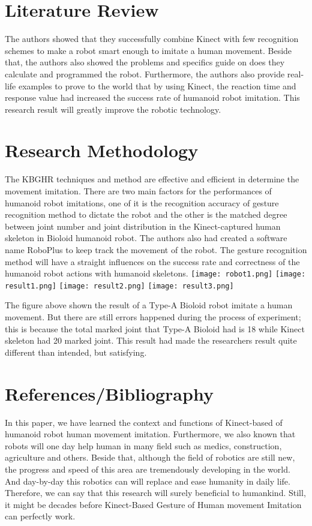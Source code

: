 \documentclass[a4paper,12pt]{article}
\begin{document}
\newpage
\section{Literature Review}
\hspace*{1cm} The authors showed that they successfully combine Kinect with few recognition schemes to make a robot smart enough to imitate a human movement. Beside that, the authors also showed the problems and specifics guide on does they calculate and programmed the robot. Furthermore, the authors also provide real-life examples to prove to the world that by using Kinect, the reaction time and response value had increased the success rate of humanoid robot imitation. This research result will greatly improve the robotic technology.

\section{Research Methodology}
\hspace*{1cm} The KBGHR techniques and method are effective and efficient in determine the movement imitation. There are two main factors for the performances of humanoid robot imitations, one of it is the recognition accuracy of gesture recognition method to dictate the robot and the other is the matched degree between joint number and joint distribution in the Kinect-captured human skeleton in Bioloid humanoid robot. The authors also had created a software name RoboPlus to keep track the movement of the robot. The gesture recognition method will have a straight influences on the success rate and correctness of  the humanoid robot actions with humanoid skeletons.
\break\break
\texttt{[image: robot1.png]}
\break
\texttt{[image: result1.png]}
\break
\texttt{[image: result2.png]}
\break
\texttt{[image: result3.png]}
\break

The figure above shown the result of a Type-A Bioloid robot imitate a human movement. But there are still errors happened during the process of experiment; this is because the total marked joint that Type-A Bioloid had is 18 while Kinect skeleton had 20 marked joint. This result had made the researchers result quite different than intended, but satisfying.

\section{References/Bibliography}
\hspace{1cm}In this paper, we have learned the context and functions of Kinect-based of humanoid robot human movement imitation. Furthermore, we also known that robots will one day help human in many field such as medics, construction, agriculture and others. Beside that, although the field of robotics are still new, the progress and speed of this area are tremendously developing in the world. And day-by-day this robotics can will replace and ease humanity in daily life. Therefore, we can say that this research will surely beneficial to humankind. Still, it might be decades before Kinect-Based Gesture of Human movement Imitation can perfectly work.
\end{document}
